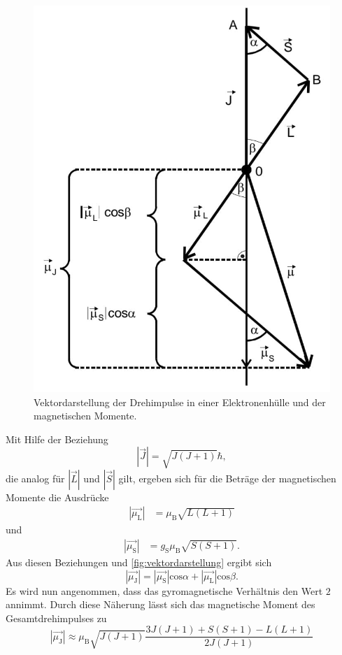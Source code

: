 \begin{figure}[H]
	\centering
	\includegraphics[width=0.6\linewidth]{data/vektordiagramm.jpeg}
	\caption{Vektordarstellung der Drehimpulse in einer Elektronenhülle und der magnetischen Momente.}
	\label{fig:vektordarstellung}
\end{figure}
\noindent
Mit Hilfe der Beziehung
\begin{equation*}
\left|\vec{J}\right| = \sqrt{J(J+1)}\hbar,
\end{equation*}
die analog für $\left|\vec{L}\right|$ und $\left|\vec{S}\right|$ gilt, ergeben sich für die Beträge der magnetischen Momente die Ausdrücke
\begin{align}
\label{eq:eq3}
\left|\vec{\mu_\text{L}}\right| &= \mu_\text{B}\sqrt{L(L+1)} 
\end{align}
und
\begin{align}
\left|\vec{\mu_\text{S}}\right| &= g_\text{S}\mu_\text{B}\sqrt{S(S+1)}.
\end{align}
Aus diesen Beziehungen und \autoref{fig:vektordarstellung} ergibt sich
\begin{equation}
\left|\vec{\mu_\text{J}}\right| = \left|\vec{\mu_\text{S}}\right|\text{cos}\alpha + \left|\vec{\mu_\text{L}}\right|\text{cos}\beta.
\end{equation}
Es wird nun angenommen, dass das gyromagnetische Verhältnis den Wert $2$ annimmt. Durch diese Näherung lässt sich das magnetische Moment des Gesamtdrehimpulses zu
\begin{equation}
\label{eq:eq4}
\left|\vec{\mu_\text{J}}\right| \approx \mu_\text{B} \sqrt{J(J+1)} \frac{3J(J+1)+S(S+1)-L(L+1)}{2J(J+1)}
\end{equation}
